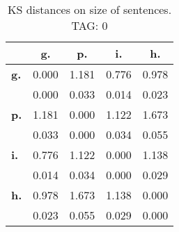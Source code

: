 \begin{table}[h!]
\begin{center}
\begin{tabular}{| l || c | c | c | c |}\hline
 & {\bf g.} & {\bf p.} & {\bf i.} & {\bf h.} \\\hline\hline
{\bf g.} & 0.000 & 1.181 & 0.776 & 0.978 \\
{\bf } & 0.000 & 0.033 & 0.014 & 0.023 \\\hline
{\bf p.} & 1.181 & 0.000 & 1.122 & 1.673 \\
{\bf } & 0.033 & 0.000 & 0.034 & 0.055 \\\hline
{\bf i.} & 0.776 & 1.122 & 0.000 & 1.138 \\
{\bf } & 0.014 & 0.034 & 0.000 & 0.029 \\\hline
{\bf h.} & 0.978 & 1.673 & 1.138 & 0.000 \\
{\bf } & 0.023 & 0.055 & 0.029 & 0.000 \\\hline
\end{tabular}
\caption{KS distances on size of sentences. TAG: 0}
\end{center}
\end{table}